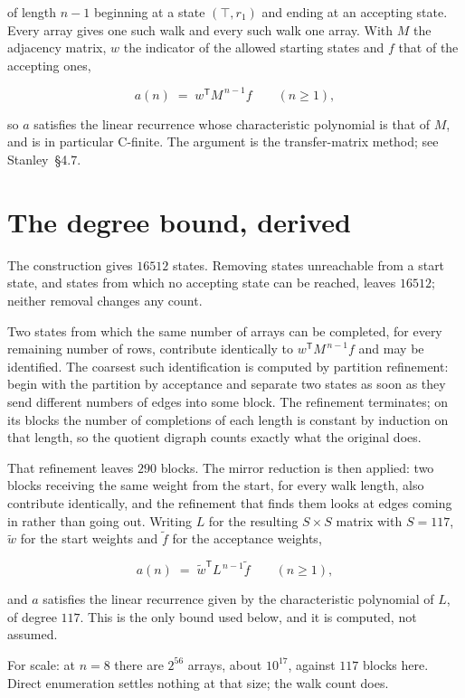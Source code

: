 \documentclass[11pt]{article}
\theoremstyle{definition}
\begin{document}
of length $n-1$ beginning at a state $(\top,r_1)$ and ending at an accepting state. Every array gives one such walk and every such walk one array. With $M$ the adjacency matrix, $w$ the indicator of the allowed starting states and $f$ that of the accepting ones,

\[a(n) \;=\; w^{\mathsf T} M^{\,n-1} f \qquad (n \ge 1),\]

so $a$ satisfies the linear recurrence whose characteristic polynomial is that of $M$, and is in particular C-finite. The argument is the transfer-matrix method; see Stanley~\S4.7.

\section{The degree bound, derived}

The construction gives $16512$ states. Removing states unreachable from a start state, and states from which no accepting state can be reached, leaves $16512$; neither removal changes any count.

Two states from which the same number of arrays can be completed, for every remaining number of rows, contribute identically to $w^{\mathsf T}M^{\,n-1}f$ and may be identified. The coarsest such identification is computed by partition refinement: begin with the partition by acceptance and separate two states as soon as they send different numbers of edges into some block. The refinement terminates; on its blocks the number of completions of each length is constant by induction on that length, so the quotient digraph counts exactly what the original does.

That refinement leaves $290$ blocks. The mirror reduction is then applied: two blocks receiving the same weight from the start, for every walk length, also contribute identically, and the refinement that finds them looks at edges coming in rather than going out. Writing $L$ for the resulting $S \times S$ matrix with $S = 117$, $\tilde w$ for the start weights and $\tilde f$ for the acceptance weights,

\[a(n) \;=\; \tilde w^{\mathsf T} L^{\,n-1} \tilde f \qquad (n \ge 1),\]

and $a$ satisfies the linear recurrence given by the characteristic polynomial of $L$, of degree $117$. This is the only bound used below, and it is computed, not assumed.

For scale: at $n = 8$ there are $2^{56}$ arrays, about $10^{17}$, against $117$ blocks here. Direct enumeration settles nothing at that size; the walk count does.
\end{document}

